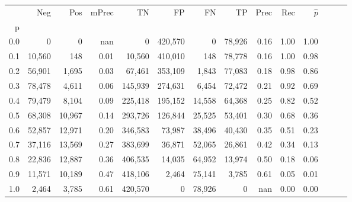 \begin{tabular}{rrrrrrrrrrrrrr}
\toprule
{} &     Neg &     Pos & mPrec &       TN &       FP &      FN &      TP &  Prec &   Rec & $\hat{p}$ \\
p   &         &         &       &          &          &         &         &       &       &           \\
\midrule
0.0 &       0 &       0 &   nan &        0 &  420,570 &       0 &  78,926 &  0.16 &  1.00 &      1.00 \\
0.1 &  10,560 &     148 &  0.01 &   10,560 &  410,010 &     148 &  78,778 &  0.16 &  1.00 &      0.98 \\
0.2 &  56,901 &   1,695 &  0.03 &   67,461 &  353,109 &   1,843 &  77,083 &  0.18 &  0.98 &      0.86 \\
0.3 &  78,478 &   4,611 &  0.06 &  145,939 &  274,631 &   6,454 &  72,472 &  0.21 &  0.92 &      0.69 \\
0.4 &  79,479 &   8,104 &  0.09 &  225,418 &  195,152 &  14,558 &  64,368 &  0.25 &  0.82 &      0.52 \\
0.5 &  68,308 &  10,967 &  0.14 &  293,726 &  126,844 &  25,525 &  53,401 &  0.30 &  0.68 &      0.36 \\
0.6 &  52,857 &  12,971 &  0.20 &  346,583 &   73,987 &  38,496 &  40,430 &  0.35 &  0.51 &      0.23 \\
0.7 &  37,116 &  13,569 &  0.27 &  383,699 &   36,871 &  52,065 &  26,861 &  0.42 &  0.34 &      0.13 \\
0.8 &  22,836 &  12,887 &  0.36 &  406,535 &   14,035 &  64,952 &  13,974 &  0.50 &  0.18 &      0.06 \\
0.9 &  11,571 &  10,189 &  0.47 &  418,106 &    2,464 &  75,141 &   3,785 &  0.61 &  0.05 &      0.01 \\
1.0 &   2,464 &   3,785 &  0.61 &  420,570 &        0 &  78,926 &       0 &   nan &  0.00 &      0.00 \\
\bottomrule
\end{tabular}
